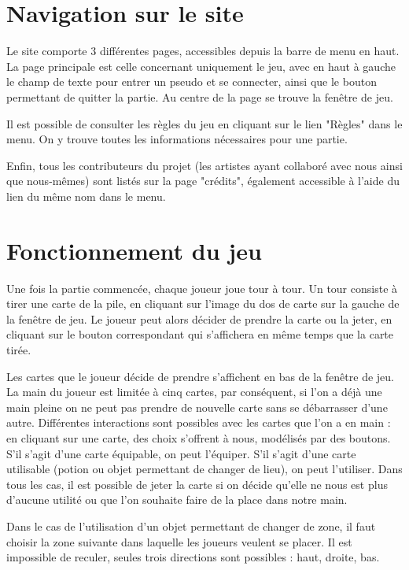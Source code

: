 \documentclass[12pt]{report}
\begin{document}
    \section{Navigation sur le site}
    
    Le site comporte 3 différentes pages, accessibles depuis la barre de menu en haut. La page principale est celle concernant uniquement le jeu, avec en haut à gauche le champ de texte pour entrer un pseudo et se connecter, ainsi que le bouton permettant de quitter la partie. Au centre de la page se trouve la fenêtre de jeu.
    
    Il est possible de consulter les règles du jeu en cliquant sur le lien "Règles" dans le menu. On y trouve toutes les informations nécessaires pour une partie.
    
    Enfin, tous les contributeurs du projet (les artistes ayant collaboré avec nous ainsi que nous-mêmes) sont listés sur la page "crédits", également accessible à l'aide du lien du même nom dans le menu. 
    
    \section{Fonctionnement du jeu}
    
    Une fois la partie commencée, chaque joueur joue tour à tour. Un tour consiste à tirer une carte de la pile, en cliquant sur l'image du dos de carte sur la gauche de la fenêtre de jeu. Le joueur peut alors décider de prendre la carte ou la jeter, en cliquant sur le bouton correspondant qui s'affichera en même temps que la carte tirée. 
    
    Les cartes que le joueur décide de prendre s'affichent en bas de la fenêtre de jeu. La main du joueur est limitée à cinq cartes, par conséquent, si l'on a déjà une main pleine on ne peut pas prendre de nouvelle carte sans se débarrasser d'une autre. Différentes interactions sont possibles avec les cartes que l'on a en main : en cliquant sur une carte, des choix s'offrent à nous, modélisés par des boutons. S'il s'agit d'une carte équipable, on peut l'équiper. S'il s'agit d'une carte utilisable (potion ou objet permettant de changer de lieu), on peut l'utiliser. Dans tous les cas, il est possible de jeter la carte si on décide qu'elle ne nous est plus d'aucune utilité ou que l'on souhaite faire de la place dans notre main. 
    
    Dans le cas de l'utilisation d'un objet permettant de changer de zone, il faut choisir la zone suivante dans laquelle les joueurs veulent se placer. Il est impossible de reculer, seules trois directions sont possibles : haut, droite, bas. 
    
\end{document}
